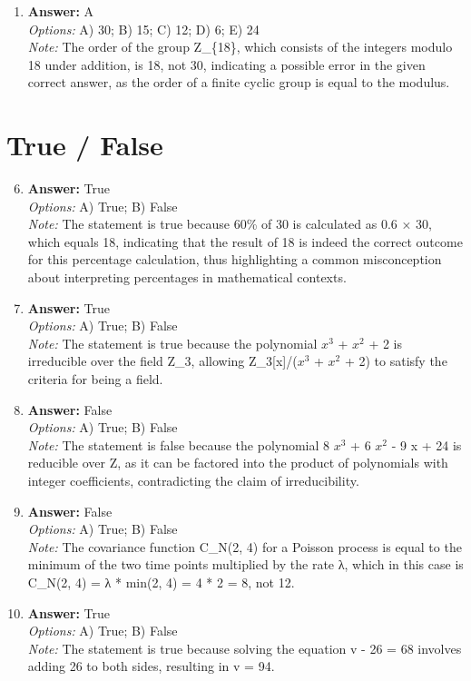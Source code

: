 \documentclass[12pt]{article}
\begin{document}
\begin{enumerate}[label=\arabic*.]
\\ \textit{Note:} The correct answer to the equation -6 x = -36 is 6, as dividing both sides of the equation by -6 yields x = 6, and checking by substituting back into the original equation confirms that -6 times 6 equals -36.
\item \textbf{Answer:} A
\\ \textit{Options:} A) 30; B) 15; C) 12; D) 6; E) 24
\\ \textit{Note:} The order of the group Z\_\{18\}, which consists of the integers modulo 18 under addition, is 18, not 30, indicating a possible error in the given correct answer, as the order of a finite cyclic group is equal to the modulus.
\end{enumerate}

\section*{True / False}
\begin{enumerate}[label=\arabic*.]
\setcounter{enumi}{5}
\item \textbf{Answer:} True
\\ \textit{Options:} A) True; B) False
\\ \textit{Note:} The statement is true because 60\% of 30 is calculated as 0.6 × 30, which equals 18, indicating that the result of 18 is indeed the correct outcome for this percentage calculation, thus highlighting a common misconception about interpreting percentages in mathematical contexts.
\item \textbf{Answer:} True
\\ \textit{Options:} A) True; B) False
\\ \textit{Note:} The statement is true because the polynomial $x^3$ + $x^2$ + 2 is irreducible over the field Z\_3, allowing Z\_3[x]/($x^3$ + $x^2$ + 2) to satisfy the criteria for being a field.
\item \textbf{Answer:} False
\\ \textit{Options:} A) True; B) False
\\ \textit{Note:} The statement is false because the polynomial 8 $x^3$ + 6 $x^2$ - 9 x + 24 is reducible over Z, as it can be factored into the product of polynomials with integer coefficients, contradicting the claim of irreducibility.
\item \textbf{Answer:} False
\\ \textit{Options:} A) True; B) False
\\ \textit{Note:} The covariance function C\_N(2, 4) for a Poisson process is equal to the minimum of the two time points multiplied by the rate λ, which in this case is C\_N(2, 4) = λ * min(2, 4) = 4 * 2 = 8, not 12.
\item \textbf{Answer:} True
\\ \textit{Options:} A) True; B) False
\\ \textit{Note:} The statement is true because solving the equation v - 26 = 68 involves adding 26 to both sides, resulting in v = 94.
\end{enumerate}
\end{document}
